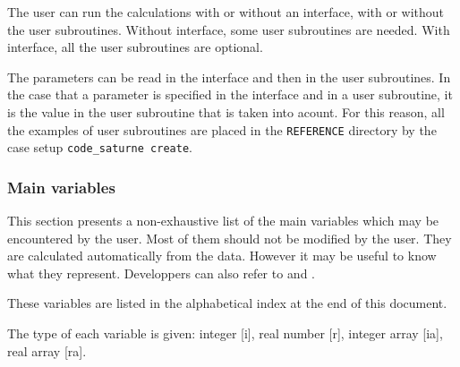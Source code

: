{{{The user can run the calculations with or without an interface, with or
 without the user subroutines. Without interface, some user subroutines
 are needed. With interface, all the user subroutines are optional.

The parameters can be read in the interface and then in the user
subroutines. In the case that a parameter is specified in the interface
 and in a user subroutine, it is the value in the user subroutine that
 is taken into acount. For this reason, all the examples of
 user subroutines are placed in the \texttt{REFERENCE} directory by the
 case setup \texttt{code\_saturne~create}.

\subsubsection{Main variables}

This section presents a non-exhaustive list of the main variables which
may be encountered by the user. Most of them should not be modified by the
user. They are calculated automatically from the data. However it may be
useful to know what they represent.
Developpers can also refer to \cite{boucker00} and \cite{theory}.

These variables are listed in the alphabetical index at the end of this
document.

The type of each variable is given: integer [i], real number [r],
integer array [ia], real array [ra].

\label{prg_dimensions}


\bigskip






\bigskip


}}}
